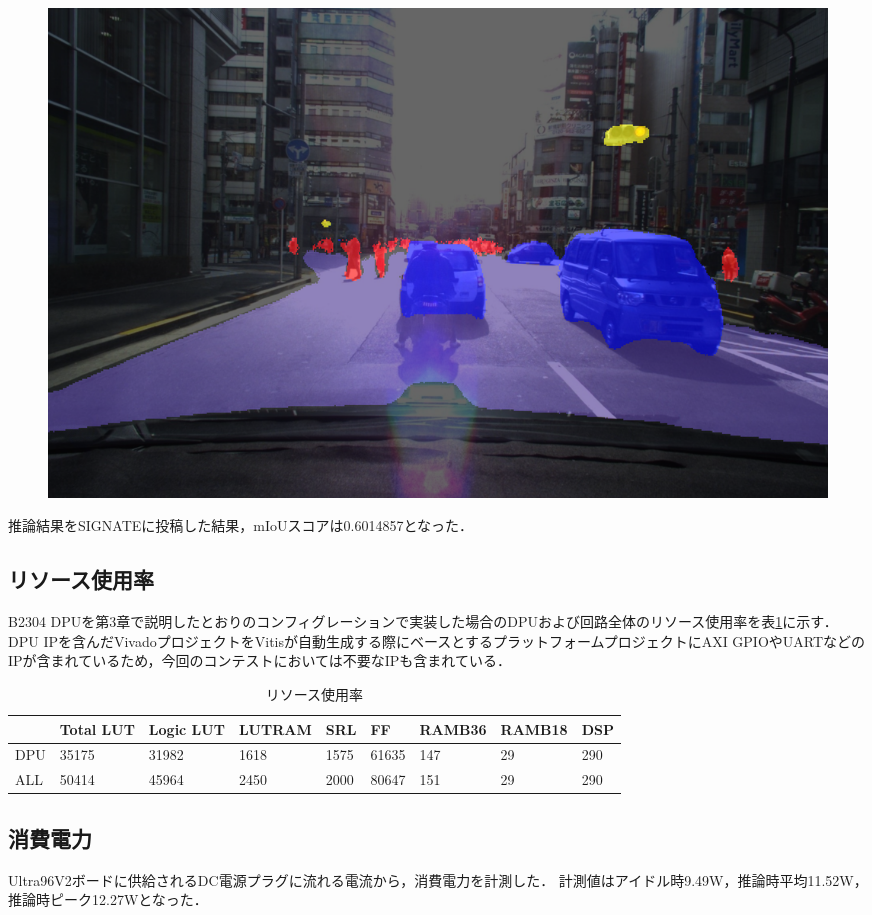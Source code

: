 \begin{figure}[h]
\begin{center}
\begin{minipage}{0.32\hsize}
\begin{center}
      \end{center}
    \end{minipage}
    \begin{minipage}{0.32\hsize}
      \begin{center}
        \includegraphics[width=\linewidth]{./figures/mixed.png}
      \end{center}
    \end{minipage}
    \label{estimate_result}
  \end{center}
\end{figure}
推論結果をSIGNATEに投稿した結果，mIoUスコアは0.6014857となった．

\subsection{リソース使用率}
B2304 DPUを第3章で説明したとおりのコンフィグレーションで実装した場合のDPUおよび回路全体のリソース使用率を表\ref{resource_util}に示す．
DPU IPを含んだVivadoプロジェクトをVitisが自動生成する際にベースとするプラットフォームプロジェクトにAXI GPIOやUARTなどのIPが含まれているため，今回のコンテストにおいては不要なIPも含まれている．

\begin{table}[h]
    \begin{center}
        \label{resource_util}
        \caption{リソース使用率}
        \begin{tabular}{lllllllll}
            & Total LUT & Logic LUT & LUTRAM & SRL  & FF    & RAMB36 & RAMB18 & DSP \\ \hline
        DPU & 35175     & 31982     & 1618   & 1575 & 61635 & 147    & 29     & 290 \\ \hline
        ALL & 50414     & 45964     & 2450   & 2000 & 80647 & 151    & 29     & 290
        \end{tabular}
    \end{center}
\end{table}
\subsection{消費電力}
Ultra96V2ボードに供給されるDC電源プラグに流れる電流から，消費電力を計測した．
計測値はアイドル時9.49W，推論時平均11.52W，推論時ピーク12.27Wとなった．
